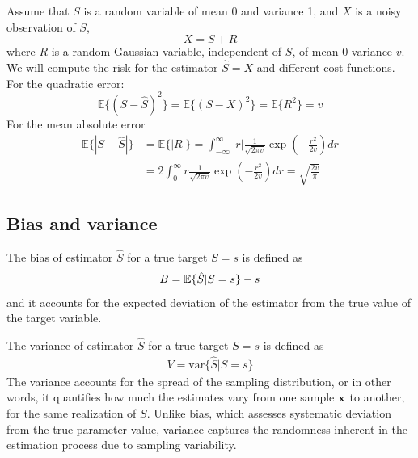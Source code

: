 \begin{example}
Assume that $S$ is a random variable of mean 0 and variance 1, and $X$ is a noisy observation of $S$,
\begin{equation}
X = S + R
\end{equation}
where $R$ is a random Gaussian variable, independent of $S$, of mean $0$ variance $v$. We will compute the risk for the estimator $\hat{S} = X$ and different cost functions. For the quadratic error:
\begin{equation}
\mathbb{E}\{(S-\hat{S})^2\} = \mathbb{E}\{(S-X)^2\} = \mathbb{E}\{R^2\} = v
\end{equation}
For the mean absolute error
\begin{align}
\mathbb{E}\{|S-\hat{S}|\}
    &= \mathbb{E}\{|R|\} 
     = \int_{-\infty}^{\infty} |r| \frac{1}{\sqrt{2\pi v}}\exp\left(-\frac{r^2}{2v}\right)dr 
\nonumber\\
    &= 2 \int_{0}^{\infty} r \frac{1}{\sqrt{2\pi v}}\exp\left(-\frac{r^2}{2v}\right)dr 
     = \sqrt{\frac{2v}{\pi}}
\end{align}
\end{example}\vspace{0.4cm}


\subsection{Bias and variance}
\label{subsec_funcion_coste}

{The bias of estimator $\hat S$ for a true target $S=s$ is defined as
\begin{align}
B = \mathbb{E}\{\hat S|S=s\} - s
\end{align}
and it accounts for the expected deviation of the estimator from the true value of the target variable.}

{The variance of estimator $\hat S$ for a true target $S=s$ is defined as
\begin{align}
V = \text{var}\{\hat S|S=s\} 
\end{align}
The variance accounts for the spread of the sampling distribution, or in other words, it quantifies how much the estimates vary from one sample ${\bf x}$ to another, for the same realization of $S$. Unlike bias, which assesses systematic deviation from the true parameter value, variance captures the randomness inherent in the estimation process due to sampling variability.}
